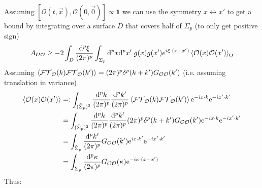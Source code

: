 \documentclass[a4paper,11pt]{article}
\numberwithin{equation}{section}
\theoremstyle{definition}
\renewcommand{\d}{{\mathrm{d}}}
\newcommand{\e}{{\mathrm{e}}}
\begin{document}
Assuming $[\mathcal{O}(t,\vec{x}),\mathcal{O}(0,\vec{0})]\propto \mathds{1}$ we can use the symmetry $x\leftrightarrow x'$ to get a bound by integrating over a surface $D$ that covers half of $\Sigma_p$ (to only get positive sign)
\begin{equation}\label{DifIne}
    A_{\mathcal{O}\mathcal{O}}\geq -2 \int_D \frac{\d^p\xi}{(2\pi)^p}\int_{\Sigma_p}\d^px\d^px'\;g(x)g(x')e^{i\xi\cdot(x-x')}\braket{\mathcal{O}(x)\mathcal{O}(x')}_\Omega
\end{equation}
Assuming $\braket{\mathcal{FT}_\mathcal{O}(k)\mathcal{FT}_\mathcal{O}(k')}=(2\pi)^p\delta^p(k+k')G_{\mathcal{O}\mathcal{O}}(k')$ (i.e. assuming translation in variance)
\begin{align*}
    \braket{\mathcal{O}(x)\mathcal{O}(x')}&=: \int_{(\Tilde{\Sigma}_p)^2}\frac{\d^pk}{(2\pi)^p}\frac{\d^pk'}{(2\pi)^p}\braket{\mathcal{FT}_\mathcal{O}(k)\mathcal{FT}_\mathcal{O}(k')}\e^{-ix \cdot k}\e^{-ix' \cdot k'}\\
    &= \int_{(\Tilde{\Sigma}_p)^2}\frac{\d^pk}{(2\pi)^p}\frac{\d^pk'}{(2\pi)^p}(2\pi)^p\delta^p(k+k')G_{\mathcal{O}\mathcal{O}}(k')\e^{-ix \cdot k}\e^{-ix' \cdot k'}\\
    &= \int_{\Tilde{\Sigma}_p}\frac{\d^pk'}{(2\pi)^p}G_{\mathcal{O}\mathcal{O}}(k')\e^{ix \cdot k'}\e^{-ix' \cdot k'}\\
    &= \int_{\Tilde{\Sigma}_p}\frac{\d^p\kappa}{(2\pi)^p}G_{\mathcal{O}\mathcal{O}}(\kappa)\e^{-i\kappa\cdot(x-x')}
\end{align*}
Thus:
\end{document}

